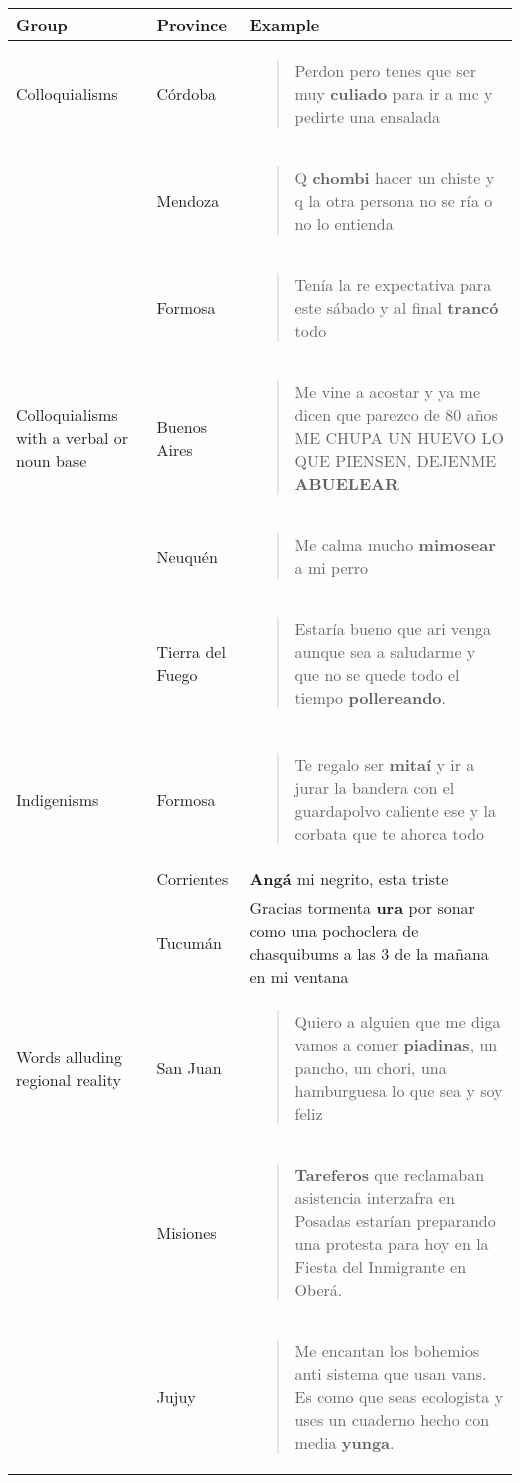 \begin{table*}[ht!]
\centering

\begin{tabular}{p{} p{} p{}}

Group               & Province & Example  \\ %

\hline
Colloquialisms      & Córdoba & \blockquote{Perdon pero tenes que ser muy \textbf{culiado} para ir a mc y pedirte una ensalada}   \\
& Mendoza & \blockquote{Q \textbf{chombi} hacer un chiste y q la otra persona no se ría o no lo entienda} \\
& Formosa & \blockquote{Tenía la re expectativa para este sábado y al final \textbf{trancó} todo} \\


\hline
Colloquialisms with a verbal or noun base& Buenos Aires &   \blockquote{Me vine a acostar y ya me dicen que parezco de 80 años ME CHUPA UN HUEVO LO QUE PIENSEN, DEJENME \textbf{ABUELEAR} } \\

& Neuquén & \blockquote{Me calma mucho \textbf{mimosear} a mi perro } \\

& Tierra del Fuego & \blockquote{Estaría bueno que ari venga aunque sea a saludarme y que no se quede todo el tiempo \textbf{pollereando}.} \\


\hline \\

Indigenisms        &  Formosa & \blockquote{Te regalo ser \textbf{mitaí} y ir a jurar la bandera con el guardapolvo caliente ese y la corbata que te ahorca todo} \\
& Corrientes & \textbf{Angá} mi negrito, esta triste \\
& Tucumán & Gracias tormenta \textbf{ura} por sonar como una pochoclera de chasquibums a las 3 de la mañana en mi ventana \\
\hline

Words alluding regional reality & San Juan & \blockquote{Quiero a alguien que me diga vamos a comer \textbf{piadinas}, un pancho, un chori, una hamburguesa lo que sea y soy feliz} \\

& Misiones & \blockquote{\textbf{Tareferos} que reclamaban asistencia interzafra en Posadas estarían preparando una protesta para hoy en la Fiesta del Inmigrante en Oberá.} \\
& Jujuy & \blockquote{Me encantan los bohemios anti sistema que usan vans. Es como que seas ecologista y uses un cuaderno hecho con media \textbf{yunga}.} \\



\end{tabular}
\end{table*}
